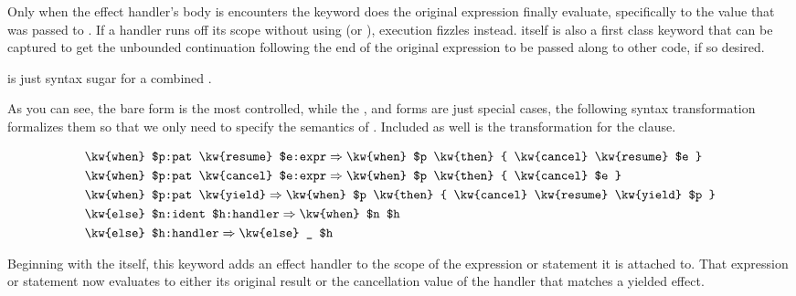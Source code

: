 Only when the effect handler's body is encounters the  keyword does the original
expression finally evaluate, specifically to the value that was passed to .
If a handler runs off its scope without using  (or ), execution
fizzles instead.  itself is also a first class keyword that can be captured
to get the unbounded continuation following the end of the original expression to be
passed along to other code, if so desired.

 is just syntax sugar for a combined .

As you can see, the bare  form is the most controlled, while the ,
 and  forms are just special cases, the following syntax
transformation formalizes them so that we only need to specify the semantics of
. Included as well is the transformation for the  clause.

\begin{align*}
    & \texttt{\kw{when} \$p:pat \kw{resume} \$e:expr} \Rightarrow \texttt{\kw{when} \$p \kw{then} \{ \kw{cancel} \kw{resume} \$e \}} \\ %
    & \texttt{\kw{when} \$p:pat \kw{cancel} \$e:expr} \Rightarrow \texttt{\kw{when} \$p \kw{then} \{ \kw{cancel} \$e \}} \\ %
    & \texttt{\kw{when} \$p:pat \kw{yield}} \Rightarrow \texttt{\kw{when} \$p \kw{then} \{ \kw{cancel} \kw{resume} \kw{yield} \$p \}} \\ %
    & \texttt{\kw{else} \$n:ident \$h:handler} \Rightarrow \texttt{\kw{when} \$n \$h} \\ %
    & \texttt{\kw{else} \$h:handler} \Rightarrow \texttt{\kw{else} \_ \$h} \\ %
\end{align*}

Beginning with the  itself, this keyword adds an effect handler to the scope
of the expression or statement it is attached to. That expression or statement now
evaluates to either its original result or the cancellation value of the handler that
matches a yielded effect.

\begin{prooftree}
\end{prooftree}

